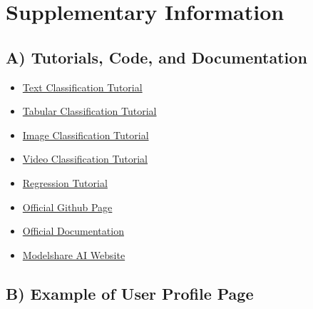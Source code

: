 \printbibliography
\newpage
\section*{Supplementary Information}
\appendix

\subsection{A) Tutorials, Code, and Documentation}
\label{app:tutorials}

\begin{itemize}

\item 
\href{https://colab.research.google.com/github/AIModelShare/aimodelshare_tutorials/blob/main/modelshareai/Text_Classification_QuickStart_IMDB.ipynb}{Text Classification Tutorial}

\item 
\href{https://colab.research.google.com/github/AIModelShare/aimodelshare_tutorials/blob/main/modelshareai/QST_Tabular_Classification.ipynb}{Tabular Classification Tutorial}

\item 
\href{https://colab.research.google.com/github/AIModelShare/aimodelshare_tutorials/blob/main/modelshareai/Keras_Image_Classification_Quick_Start_Tutorial.ipynb}{Image Classification Tutorial}

\item 
\href{https://colab.research.google.com/github/AIModelShare/aimodelshare_tutorials/blob/main/modelshareai/Keras_Video_Classification_Quick_Start_Tutorial(1).ipynb}{Video Classification Tutorial}

\item 
\href{https://www.modelshare.ai/notebooks/notebook:229}{Regression Tutorial}

\item 
\href{https://github.com/AIModelShare/aimodelshare}{Official Github Page}

\item 
\href{https://aimodelshare.readthedocs.io/en/latest/index.html}{Official Documentation}

\item 
\href{https://www.modelshare.ai/}{Modelshare AI Website}


\end{itemize}

\newpage
\subsection{B) Example of User Profile Page}
\label{app:profile_page}

